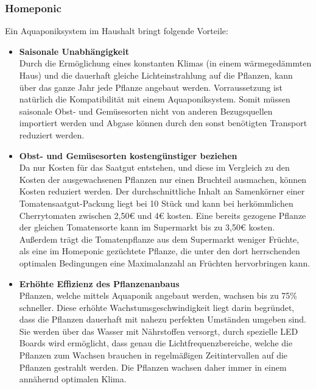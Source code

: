 \subsubsection{Homeponic}
Ein Aquaponiksystem im Haushalt bringt folgende Vorteile:
\begin{itemize}[leftmargin=4.5mm]
    \item \textbf{Saisonale Unabhängigkeit}\mbox{} \\
    Durch die Ermöglichung eines konstanten Klimas (in einem wärmegedämmten Haus) und die dauerhaft gleiche Lichteinstrahlung auf die Pflanzen, kann über das ganze Jahr jede Pflanze angebaut werden. Vorraussetzung ist natürlich die Kompatibilität mit einem Aquaponiksystem. Somit müssen saisonale Obst- und Gemüsesorten nicht von anderen Bezugsquellen importiert werden und Abgase können durch den sonst benötigten Transport reduziert werden. 
    \item \textbf{Obst- und Gemüsesorten kostengünstiger beziehen}\mbox{} \\
    Da nur Kosten für das Saatgut entstehen, und diese im Vergleich zu den Kosten der ausgewachsenen Pflanzen nur einen Bruchteil ausmachen, können Kosten reduziert werden. Der durchschnittliche Inhalt an Samenkörner einer Tomatensaatgut-Packung liegt bei 10 Stück und kann bei herkömmlichen Cherrytomaten zwischen 2,50€ und 4€ kosten. Eine bereits gezogene Pflanze der gleichen Tomatensorte kann im Supermarkt bis zu 3,50€ kosten. Außerdem trägt die Tomatenpflanze aus dem Supermarkt weniger Früchte, als eine im Homeponic gezüchtete Pflanze, die unter den dort herrschenden optimalen Bedingungen eine Maximalanzahl an Früchten hervorbringen kann.
    \newpage
    \item \textbf{Erhöhte Effizienz des Pflanzenanbaus}\mbox{} \\
    Pflanzen, welche mittels Aquaponik angebaut werden, wachsen bis zu 75\% schneller. Diese erhöhte Wachstumsgeschwindigkeit liegt darin begründet, dass die Pflanzen dauerhaft mit nahezu perfekten Umständen umgeben sind. Sie werden über das Wasser mit Nährstoffen versorgt, durch spezielle LED Boards wird ermöglicht, dass genau die Lichtfrequenzbereiche, welche die Pflanzen zum Wachsen brauchen in regelmäßigen Zeitintervallen auf die Pflanzen gestrahlt werden. Die Pflanzen wachsen daher immer in einem annähernd optimalen Klima.
\end{itemize}